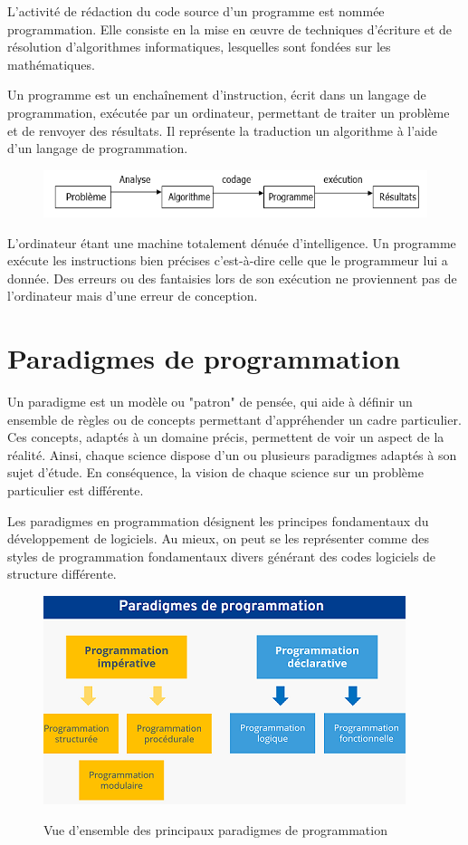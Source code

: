\documentclass[a4paper,12pt]{article} %
\begin{document}
L'activité de rédaction du code source d'un programme est nommée programmation. Elle consiste en la mise en œuvre de techniques d'écriture et de résolution d'algorithmes informatiques, lesquelles sont fondées sur les mathématiques. 

Un programme est un enchaînement d'instruction, écrit dans un langage de programmation, exécutée par un ordinateur, permettant de traiter un problème et de renvoyer des résultats. Il représente la traduction un algorithme à l'aide d'un langage de programmation.
\begin{figure}[h] %
  \centering %
  \includegraphics[scale=1]{img1.PNG} %
\end{figure}

L'ordinateur étant une machine totalement dénuée d'intelligence. Un programme exécute les instructions bien précises c'est-à-dire celle que le programmeur lui a donnée. Des erreurs ou des fantaisies lors de son exécution ne proviennent pas de l'ordinateur mais d'une erreur de conception.

\section{Paradigmes de programmation} %

Un paradigme est un modèle ou "patron" de pensée, qui aide à définir un ensemble de règles ou de concepts permettant d'appréhender un cadre particulier. 
Ces concepts, adaptés à un domaine précis, permettent de voir un aspect de la réalité. 
Ainsi, chaque science dispose d'un ou plusieurs paradigmes adaptés à son sujet d'étude. 
En conséquence, la vision de chaque science sur un problème particulier est différente.

Les paradigmes en programmation désignent les principes fondamentaux du développement de logiciels. Au mieux, on peut se les représenter comme des styles de programmation fondamentaux divers générant des codes logiciels de structure différente.

\begin{figure}[h] %
  \centering %
  \includegraphics[scale=1]{paradigme.png} %
 
 Vue d’ensemble des principaux paradigmes de programmation
\end{figure}
\end{document}

